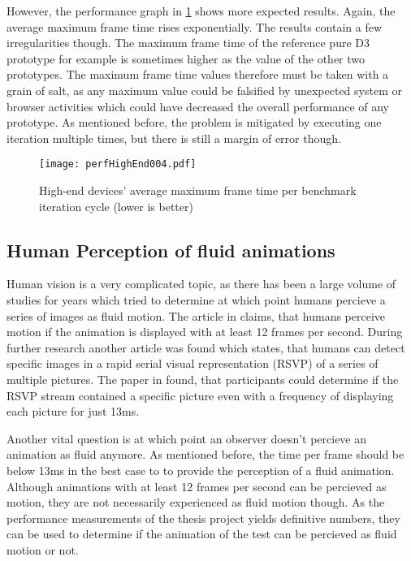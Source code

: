 However, the performance graph in \ref{fig:perfHighEnd004} shows more expected results. Again, the average maximum frame time rises exponentially. The results contain a few irregularities though. The maximum frame time of the reference pure D3 prototype for example is sometimes higher as the value of the other two prototypes. The maximum frame time values therefore must be taken with a grain of salt, as any maximum value could be falsified by unexpected system or browser activities which could have decreased the overall performance of any prototype. As mentioned before, the problem is mitigated by executing one iteration multiple times, but there is still a margin of error though.

\begin{figure}
\centering
\texttt{[image: perfHighEnd004.pdf]}
\caption{High-end devices' average maximum frame time per benchmark iteration cycle (lower is better)}
\label{fig:perfHighEnd004}
\end{figure}

\subsection{Human Perception of fluid animations}
\label{sub:humanPerception}


Human vision is a very complicated topic, as there has been a large volume of studies for years which tried to determine at which point humans percieve a series of images as fluid motion. The article in \cite{RestorationOfMotionPictureFilm} claims, that humans perceive motion if the animation is displayed with at least 12 frames per second. During further research another article was found which states, that humans can detect specific images in a rapid serial visual representation (RSVP) of a series of multiple pictures. The paper in \cite{Potter2014} found, that participants could determine if the RSVP stream contained a specific picture even with a frequency of displaying each picture for just 13ms. 

Another vital question is at which point an observer doesn't percieve an animation as fluid anymore. As mentioned before, the time per frame should be below 13ms in the best case to to provide the perception of a fluid animation. Although animations with at least 12 frames per second can be percieved as motion, they are not necessarily experienced as fluid motion though. As the performance measurements of the thesis project yields definitive numbers, they can be used to determine if the animation of the test can be percieved as fluid motion or not.

